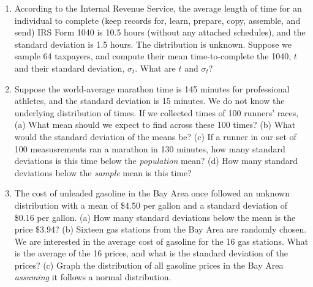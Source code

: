\documentclass{article}
\begin{document}
\begin{enumerate}
\item According to the Internal Revenue Service, the average length of time for an individual to complete (keep records for, learn, prepare, copy, assemble, and send) IRS Form 1040 is 10.5 hours (without any attached schedules), and the standard deviation is 1.5 hours. The distribution is unknown.  Suppose we sample 64 taxpayers, and compute their mean time-to-complete the 1040, $t$ and their standard deviation, $\sigma_t$.  What are $t$ and $\sigma_t$? \\ \vspace{1cm}
\item Suppose the world-average marathon time is 145 minutes for professional athletes, and the standard deviation is 15 minutes.  We do not know the underlying distribution of times.  If we collected times of 100 runners' races, (a) What mean should we expect to find across these 100 times? (b) What would the standard deviation of the means be? (c) If a runner in our set of 100 measusrements ran a marathon in 130 minutes, how many standard deviations is this time below the \textit{population} mean? (d) How many standard deviations below the \textit{sample} mean is this time? \\ \vspace{1cm}
\item The cost of unleaded gasoline in the Bay Area once followed an unknown distribution with a mean of \$4.50 per gallon and a standard deviation of \$0.16 per gallon. (a) How many standard deviations below the mean is the price \$3.94? (b) Sixteen gas stations from the Bay Area are randomly chosen. We are interested in the average cost of gasoline for the 16 gas stations. What is the average of the 16 prices, and what is the standard deviation of the prices? (c) Graph the distribution of all gasoline prices in the Bay Area \textit{assuming} it follows a normal distribution.
\end{enumerate}
\end{document}
